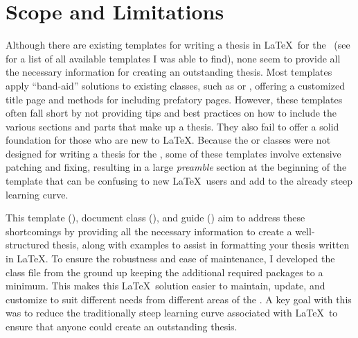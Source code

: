 	\section{Scope and Limitations}
		Although there are existing templates for writing a thesis in \LaTeX\ for the \University\ (see  for a list of all available templates I was able to find), none seem to provide all the necessary information for creating an outstanding thesis.
		Most templates apply ``band-aid'' solutions to existing classes, such as  or , offering a customized title page and methods for including prefatory pages.
		However, these templates often fall short by not providing tips and best practices on how to include the various sections and parts that make up a thesis.
		They also fail to offer a solid foundation for those who are new to \LaTeX.
		Because the  or  classes were not designed for writing a thesis for the \University, some of these templates involve extensive patching and fixing, resulting in a large \textit{preamble} section at the beginning of the template that can be confusing to new \LaTeX\ users and add to the already steep learning curve.

		\begin{landscape}
		\end{landscape}

		This template (), document class (), and guide () aim to address these shortcomings by providing all the necessary information to create a well-structured thesis, along with examples to assist in formatting your thesis written in \LaTeX.
		To ensure the robustness and ease of maintenance, I developed the class file from the ground up keeping the additional required packages to a minimum.
		This makes this \LaTeX\ solution easier to maintain, update, and customize to suit different needs from different areas of the \University.
		A key goal with this was to reduce the traditionally steep learning curve associated with \LaTeX\ to ensure that anyone could create an outstanding thesis.

